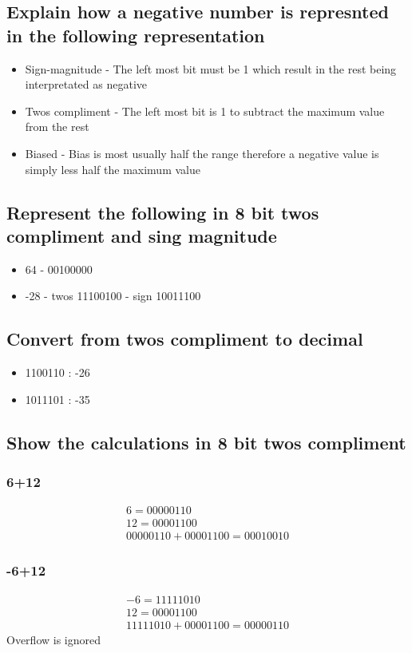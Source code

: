 \documentclass[12pt, a4paper]{article}
\begin{document}
		\subsection{Explain how a negative number is represnted in the following representation}
			\begin{itemize}
				\item Sign-magnitude - The left most bit must be 1 which result in the rest being interpretated as negative
				\item Twos compliment - The left most bit is 1 to subtract the maximum value from the rest
				\item Biased - Bias is most usually half the range therefore a negative value is simply less half the maximum value
			\end{itemize}
		\subsection{Represent the following in 8 bit twos compliment and sing magnitude}
			\begin{itemize}
				\item 64 - 00100000
				\item -28 - twos 11100100 - sign 10011100
			\end{itemize}
		\subsection{Convert from twos compliment to decimal}
			\begin{itemize}
				\item 1100110 : -26
				\item 1011101 : -35
			\end{itemize}
		\subsection{Show the calculations in 8 bit twos compliment}
			\subsubsection{6+12}
				\begin{align*}
					6=00000110\\
					12=00001100\\
					00000110+00001100=00010010
				\end{align*}
			\subsubsection{-6+12}
				\begin{align*}
					-6=11111010\\
					12=00001100\\
					11111010+00001100=00000110
				\end{align*}
				Overflow is ignored
\end{document}
